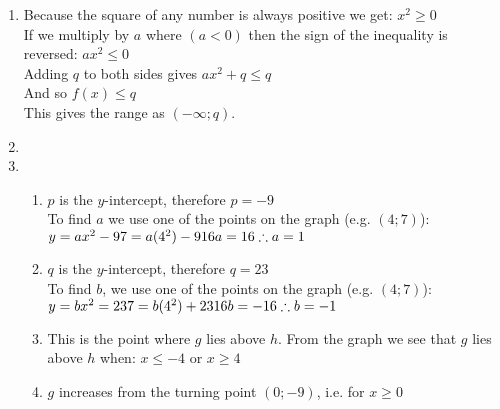  \begin{solutions}{}{
\begin{enumerate}[itemsep=5pt, label=\textbf{\arabic*}. ] 


\item 
Because the square of any number is always positive we get: $x^2\geq0$\\
If we multiply by $a$ where $(a < 0)$ then the sign of the inequality is reversed: $ax^2 \leq 0$\\
Adding $q$ to both sides gives $ax^2 + q \leq q$\\ 
And so $f(x) \leq q$\\
This gives the range as $(-\infty; q)$.

\item 
{}
\item 
\begin{enumerate}[noitemsep, label=\textbf{(\alph*)} ] 
 
   \item $p$ is the $y$-intercept, therefore $p=-9$\\
To find $a$ we use one of the points on the graph (e.g. $(4;7)$):\\
$y=ax^2-9\\
7= a(4^2) - 9\\
16a=16\\
\therefore a=1$
    \item 
$q$ is the $y$-intercept, therefore  $q = 23$\\ 
To find $b$, we use one of the points on the graph (e.g. $(4;7)$): 
$y=bx^2 =23\\
7= b(4^2) +23\\
16b=-16\\
\therefore b=-1$
    \item This is the point where $g$ lies above $h$. 
From the graph we see that $g$ lies above $h$ when: $x \leq -4$ or $x \geq 4$ 
    \item $g$ increases from the turning point $(0;-9)$, i.e. for $x\geq0$ %
  
\end{enumerate}

\end{enumerate}}
\end{solutions}


